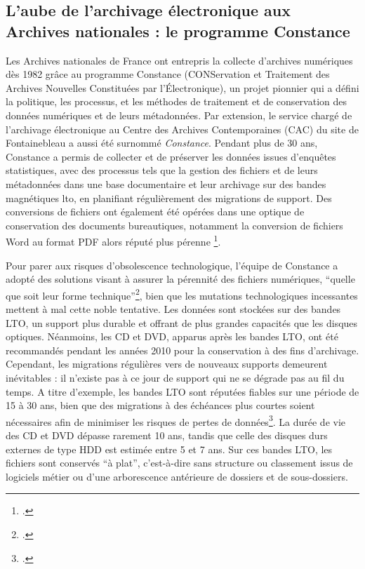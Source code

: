 \subsection*{L'aube de l'archivage électronique aux Archives nationales : le programme Constance}

Les Archives nationales de France ont entrepris la collecte d’archives numériques dès 1982 grâce au programme Constance (CONServation et Traitement des Archives Nouvelles Constituées par l’Électronique), un projet pionnier qui a défini la politique, les processus, et les méthodes de traitement et de conservation des données numériques et de leurs métadonnées. Par extension, le service chargé de l’archivage électronique au Centre des Archives Contemporaines (CAC) du site de Fontainebleau a aussi été surnommé \emph{Constance}. Pendant plus de 30 ans, Constance a permis de collecter et de préserver les données issues d'enquêtes statistiques, avec des processus tels que la gestion des fichiers et de leurs métadonnées dans une base documentaire et leur archivage sur des bandes magnétiques \gls{lto}, en planifiant régulièrement des migrations de support. Des conversions de fichiers ont également été opérées dans une optique de conservation des documents bureautiques, notamment la conversion de fichiers Word au format PDF alors réputé plus pérenne \footcite{levasseurRetourExperienceStrategie2022}. 

Pour parer aux risques d'obsolescence technologique, l'équipe de Constance a adopté des solutions visant à assurer la pérennité des fichiers numériques, \enquote{quelle que soit leur forme technique}\footcite[p.62]{conchonArchivageFichiersInformatiques1988}, bien que les mutations technologiques incessantes mettent à mal cette noble tentative. Les données sont stockées sur des bandes LTO, un support plus durable et offrant de plus grandes capacités que les disques optiques. Néanmoins, les CD et DVD, apparus après les bandes LTO, ont été recommandés pendant les années 2010 pour la conservation à des fins d'archivage. Cependant, les migrations régulières vers de nouveaux supports demeurent inévitables : il n'existe pas à ce jour de support qui ne se dégrade pas au fil du temps. A titre d'exemple, les bandes LTO sont réputées fiables sur une période de 15 à 30 ans, bien que des migrations à des échéances plus courtes soient nécessaires afin de minimiser les risques de pertes de données\footcite{verlhiacQuEstceQue2023}. La durée de vie des CD et DVD dépasse rarement 10 ans, tandis que celle des disques durs externes de type HDD est estimée entre 5 et 7 ans. Sur ces bandes LTO, les fichiers sont conservés \enquote{à plat}, c'est-à-dire sans structure ou classement issus de logiciels métier ou d'une arborescence antérieure de dossiers et de sous-dossiers. 

